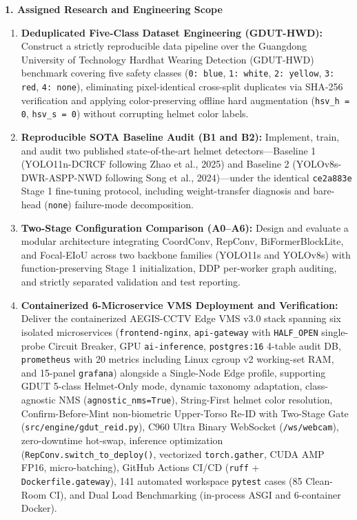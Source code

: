 \vspace{6pt}
\noindent\textbf{1. Assigned Research and Engineering Scope}
\begin{enumerate}[leftmargin=1.8em, itemsep=3pt]
  \item \textbf{Deduplicated Five-Class Dataset Engineering (GDUT-HWD):} Construct a strictly reproducible data pipeline over the Guangdong University of Technology Hardhat Wearing Detection (GDUT-HWD) benchmark covering five safety classes (\texttt{0: blue}, \texttt{1: white}, \texttt{2: yellow}, \texttt{3: red}, \texttt{4: none}), eliminating pixel-identical cross-split duplicates via SHA-256 verification and applying color-preserving offline hard augmentation (\texttt{hsv\_h = 0}, \texttt{hsv\_s = 0}) without corrupting helmet color labels.
  \item \textbf{Reproducible SOTA Baseline Audit (B1 and B2):} Implement, train, and audit two published state-of-the-art helmet detectors---Baseline 1 (YOLO11n-DCRCF following Zhao et al., 2025) and Baseline 2 (YOLOv8s-DWR-ASPP-NWD following Song et al., 2024)---under the identical \texttt{ce2a883e} Stage 1 fine-tuning protocol, including weight-transfer diagnosis and bare-head (\texttt{none}) failure-mode decomposition.
  \item \textbf{Two-Stage Configuration Comparison (A0--A6):} Design and evaluate a modular architecture integrating CoordConv, RepConv, BiFormerBlockLite, and Focal-EIoU across two backbone families (YOLO11s and YOLOv8s) with function-preserving Stage 1 initialization, DDP per-worker graph auditing, and strictly separated validation and test reporting.
  \item \textbf{Containerized 6-Microservice VMS Deployment and Verification:} Deliver the containerized AEGIS-CCTV Edge VMS v3.0 stack spanning six isolated microservices (\texttt{frontend-nginx}, \texttt{api-gateway} with \texttt{HALF\_OPEN} single-probe Circuit Breaker, GPU \texttt{ai-inference}, \texttt{postgres:16} 4-table audit DB, \texttt{prometheus} with 20 metrics including Linux cgroup v2 working-set RAM, and 15-panel \texttt{grafana}) alongside a Single-Node Edge profile, supporting GDUT 5-class Helmet-Only mode, dynamic taxonomy adaptation, class-agnostic NMS (\texttt{agnostic\_nms=True}), String-First helmet color resolution, Confirm-Before-Mint non-biometric Upper-Torso Re-ID with Two-Stage Gate (\nolinkurl{src/engine/gdut_reid.py}), C960 Ultra Binary WebSocket (\texttt{/ws/webcam}), zero-downtime hot-swap, inference optimization (\nolinkurl{RepConv.switch_to_deploy()}, vectorized \texttt{torch.gather}, CUDA AMP FP16, micro-batching), GitHub Actions CI/CD (\texttt{ruff} + \nolinkurl{Dockerfile.gateway}), 141 automated workspace \texttt{pytest} cases (85 Clean-Room CI), and Dual Load Benchmarking (in-process ASGI and 6-container Docker).
\end{enumerate}


